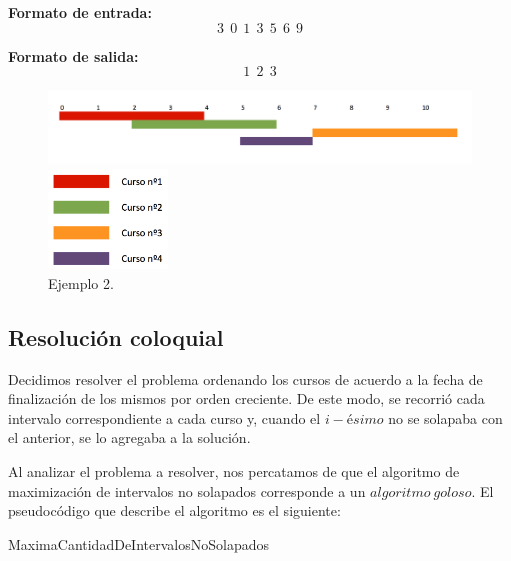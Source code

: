 \textbf{Formato de entrada:} $$3\ \ 0\ \ 1\ \ 3\ \ 5\ \ 6\ \ 9$$

\textbf{Formato de salida:} $$1\ \ 2\ \ 3$$


\begin{figure}[H] %
\begin{center}
\includegraphics[width=480pt]{../imgs/ejemplo2ej2.png}
\end{center}
\includegraphics[width=90pt]{../imgs/leyendaej2.png}
\caption{Ejemplo 2.}
\end{figure}


\subsection{Resolución coloquial}
Decidimos resolver el problema ordenando los cursos de acuerdo a la fecha de finalización de los mismos por orden creciente. De este modo, se recorrió cada intervalo correspondiente a cada curso y, cuando el $i-ésimo$ no se solapaba con el anterior, se lo agregaba a la solución.\newline

Al analizar el problema a resolver, nos percatamos de que el algoritmo de maximización de intervalos no solapados corresponde a un $algoritmo\ goloso$. El pseudocódigo que describe el algoritmo es el siguiente:\newline


\begin{algorithm}[H]
	\SetAlgoLined
	\caption{MaximaCantidadDeIntervalosNoSolapados}
\end{algorithm}

